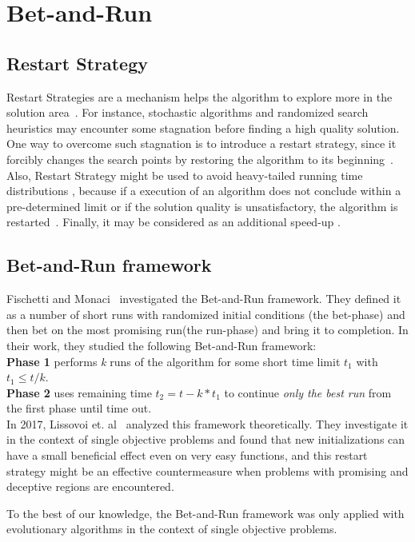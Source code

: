 \section{Bet-and-Run}\label{intro}

\subsection{Restart Strategy}
Restart Strategies are a mechanism helps the algorithm to explore more in the solution area~\cite{yu2018simulated}. For instance, stochastic algorithms and randomized search heuristics may encounter some stagnation before finding a high quality solution. One way to overcome  such stagnation is to introduce a restart strategy, since it forcibly changes the search points by restoring the algorithm to its beginning~\cite{kanahara2018restart}. Also, Restart Strategy might be used to avoid heavy-tailed running time distributions \cite{gomes2000heavy}, because if a execution of an algorithm does not conclude within a pre-determined limit or if the solution quality is unsatisfactory, the algorithm is restarted~\cite{lissovoi2017theoretical}. Finally, it may be considered as an additional speed-up \cite{friedrich2017generic}.

\subsection{Bet-and-Run framework}


Fischetti and Monaci~\cite{fischetti2014exploiting} investigated the Bet-and-Run framework. They defined it as a number of short runs with randomized initial conditions (the bet-phase) and then bet on the most promising run(the run-phase) and bring it to completion. In their work, they studied the following Bet-and-Run framework:\\


\indent \textbf{Phase 1} performs \textit{k} runs of the algorithm for some short time limit \textit{$t_1$} with $t_1 \leq t/k$.\\
\indent \textbf{Phase 2} uses remaining time $t_2 = t - k*t_1$ to continue \textit{only the best run} from the first phase until time out. \\

In 2017, Lissovoi et. al~\cite{lissovoi2017theoretical} analyzed this framework theoretically. They investigate it in the context of single objective problems and found that new initializations can have a small beneficial effect even on very easy functions, and this restart strategy might be an effective countermeasure when problems with promising and deceptive regions are encountered.


To the best of our knowledge, the Bet-and-Run framework was only applied with evolutionary algorithms in the context of single objective problems. 

